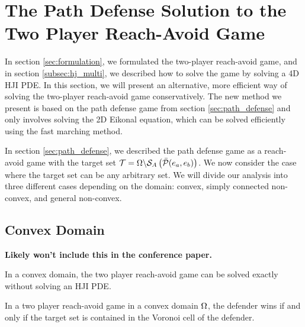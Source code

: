 \section{The Path Defense Solution to the Two Player Reach-Avoid Game}
\label{sec:reach_avoid}
In section \ref{sec:formulation}, we formulated the two-player reach-avoid game, and in section \ref{subsec:hj_multi}, we described how to solve the game by solving a 4D HJI PDE. In this section, we will present an alternative, more efficient way of solving the two-player reach-avoid game conservatively. The new method we present is based on the path defense game from section \ref{sec:path_defense} and only involves solving the 2D Eikonal equation, which can be solved efficiently using the fast marching method.

In section \ref{sec:path_defense}, we described the path defense game as a reach-avoid game with the target set $\mathcal{T}=\Omega\backslash\mathcal{S}_A\left(\bar{\mathcal{P}}(e_a,e_b)\right)$. We now consider the case where the target set can be any arbitrary set. We will divide our analysis into three different cases depending on the domain: convex, simply connected non-convex, and general non-convex.

\subsection{Convex Domain}
\textbf{Likely won't include this in the conference paper.}

In a convex domain, the two player reach-avoid game can be solved exactly without solving an HJI PDE.

\begin{lem} \label{lem:cvx_domain}
In a two player reach-avoid game in a convex domain $\Omega$, the defender wins if and only if the target set is contained in the Voronoi cell of the defender.
\end{lem}

